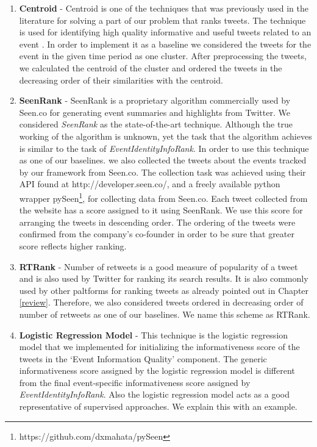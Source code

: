 \begin{enumerate}
\item \textbf{Centroid} - Centroid is one of the techniques that was previously used in the literature for solving a part of our problem that ranks tweets. The technique is used for identifying high quality informative and useful tweets related to an event   \cite{becker2011selecting}. In order to implement it as a baseline we considered the tweets for the event in the given time period as one cluster. After preprocessing the tweets, we calculated the centroid of the cluster and ordered the tweets in the decreasing order of their similarities with the centroid.

\item \textbf{SeenRank} - SeenRank is a proprietary algorithm commercially used by Seen.co for generating event summaries and highlights from Twitter. We considered \textit{SeenRank} as the state-of-the-art technique. Although the true working of the algorithm is unknown, yet the task that the algorithm achieves is similar to the task of \textit{EventIdentityInfoRank}. In order to use this technique as one of our baselines. we also collected the tweets about the events tracked by our framework from Seen.co. The collection task was achieved using their API found at http://developer.seen.co/, and a freely available python wrapper pySeen\footnote{https://github.com/dxmahata/pySeen}, for collecting data from Seen.co. Each tweet collected from the website has a score assigned to it using SeenRank. We use this score for arranging the tweets in descending order. The ordering of the tweets were confirmed from the company's co-founder in order to be sure that greater score reflects higher ranking.



\item \textbf{RTRank} - Number of retweets is a good measure of popularity of a tweet and is also used by Twitter for ranking its search results. It is also commonly used by other paltforms for ranking tweets as already pointed out in Chapter \ref{review}. Therefore, we also considered tweets ordered in decreasing order of number of retweets as one of our baselines. We name this scheme as RTRank.

\item \textbf{Logistic Regression Model} - This technique is the logistic regression model that we implemented for initializing the informativeness score of the tweets in the `Event Information Quality' component. The generic informativeness score assigned by the logistic regression model is different from the final event-specific informativeness score assigned by \textit{EventIdentityInfoRank}. Also the logistic regression model acts as a good representative of supervised approaches. We explain this with an example.


\end{enumerate}
